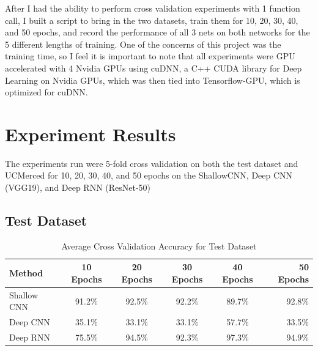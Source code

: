 \documentclass[12pt]{article}
\begin{document}
After I had the ability to perform cross validation experiments with 1 function call, I built a script to bring in the two datasets, train them for 10, 20, 30, 40, and 50 epochs, and record the performance of all 3 nets on both networks for the 5 different lengths of training. One of the concerns of this project was the training time, so I feel it is important to note that all experiments were GPU accelerated with 4 Nvidia GPUs using cuDNN, a C++ CUDA library for Deep Learning on Nvidia GPUs, which was then tied into Tensorflow-GPU, which is optimized for cuDNN. 
	
	\section{Experiment Results}
	
	The experiments run were 5-fold cross validation on  both the test dataset and UCMerced for 10, 20, 30, 40, and 50 epochs on the ShallowCNN, Deep CNN (VGG19), and Deep RNN (ResNet-50)
	\subsection{Test Dataset}

	\begin{table}[h!]
		\begin{center}
			\caption{Average Cross Validation Accuracy for Test Dataset}
			\label{table:test}
			\begin{tabular}{l | S | S | S | S |  r}
				\textbf{Method} & \textbf{10 Epochs} & \textbf{20 Epochs} & \textbf{30 Epochs} & \textbf{40 Epochs} & \textbf{50 Epochs} \\
				\hline
				Shallow CNN & 91.2\% & 92.5\% & 92.2\% & 89.7\% & 92.8\% \\
				Deep CNN & 35.1\% & 33.1\% & 33.1\% & 57.7\% & 33.5\% \\
				Deep RNN & 75.5\% & 94.5\% & 92.3\% & 97.3\% & 94.9\% \\
				
			
			\end{tabular}					
		
		
		\end{center}
	
	\end{table}
\end{document}
